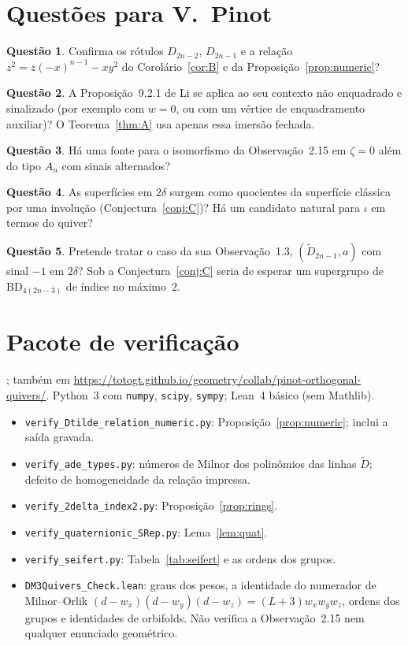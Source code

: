 \documentclass[11pt]{article}
\theoremstyle{definition}
\newtheorem{question}{Questão}
\theoremstyle{remark}
\newcommand{\BD}{\mathrm{BD}}
\newcommand{\bundleurl}{https://totogt.github.io/geometry/collab/pinot-orthogonal-quivers/}
\begin{document}
\section{Questões para V.~Pinot}
\begin{question} Confirma os rótulos $D_{2n-2}$, $D_{2n-1}$ e a relação $z^2=z(-x)^{n-1}-xy^2$ do Corolário~\ref{cor:B} e da Proposição~\ref{prop:numeric}?\end{question}
\begin{question}\label{q:li} A Proposição~9.2.1 de Li se aplica ao seu contexto não enquadrado e sinalizado (por exemplo com $w=0$, ou com um vértice de enquadramento auxiliar)? O Teorema~\ref{thm:A} usa apenas essa imersão fechada.\end{question}
\begin{question} Há uma fonte para o isomorfismo da Observação~2.15 em $\zeta=0$ além do tipo $A_n$ com sinais alternados?\end{question}
\begin{question} As superfícies em $2\delta$ surgem como quocientes da superfície clássica por uma involução (Conjectura~\ref{conj:C})? Há um candidato natural para $\iota$ em termos do quiver?\end{question}
\begin{question} Pretende tratar o caso da sua Observação~1.3, $(\widetilde D_{2n-1},a)$ com sinal $-1$ em $2\delta$? Sob a Conjectura~\ref{conj:C} seria de esperar um supergrupo de $\BD_{4(2n-3)}$ de índice no máximo~$2$.\end{question}

\appendix
\section{Pacote de verificação}
; também em \url{\bundleurl}. Python~3 com \texttt{numpy}, \texttt{scipy}, \texttt{sympy}; Lean~4 básico (sem Mathlib).
\begin{itemize}[leftmargin=*]
\item \texttt{verify\_Dtilde\_relation\_numeric.py}: Proposição~\ref{prop:numeric}; inclui a saída gravada.
\item \texttt{verify\_ade\_types.py}: números de Milnor dos polinômios das linhas $\widetilde D$; defeito de homogeneidade da relação impressa.
\item \texttt{verify\_2delta\_index2.py}: Proposição~\ref{prop:rings}.
\item \texttt{verify\_quaternionic\_SRep.py}: Lema~\ref{lem:quat}.
\item \texttt{verify\_seifert.py}: Tabela~\ref{tab:seifert} e as ordens dos grupos.
\item \texttt{DM3Quivers\_Check.lean}: graus dos pesos, a identidade do numerador de Milnor--Orlik $(d-w_x)(d-w_y)(d-w_z)=(L+3)w_xw_yw_z$, ordens dos grupos e identidades de orbifolds. Não verifica a Observação~2.15 nem qualquer enunciado geométrico.
\end{itemize}
\end{document}
